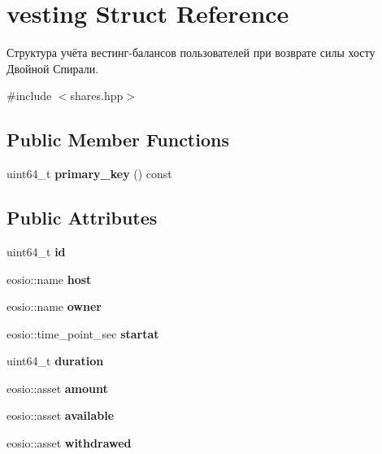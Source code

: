 \hypertarget{structvesting}{}\section{vesting Struct Reference}
\label{structvesting}


Структура учёта вестинг-\/балансов пользователей при возврате силы хосту Двойной Спирали.  




{\ttfamily \#include $<$shares.\+hpp$>$}

\subsection*{Public Member Functions}
\begin{DoxyCompactItemize}
\item 
\mbox{\label{structvesting_a35ede92a5445d2ab793b0bbbc18c5acb}} 
uint64\+\_\+t {\bfseries primary\+\_\+key} () const
\end{DoxyCompactItemize}
\subsection*{Public Attributes}
\begin{DoxyCompactItemize}
\item 
\mbox{\label{structvesting_a6288cd23eebb2f8bd05aec23647f7d6d}} 
uint64\+\_\+t {\bfseries id}
\item 
\mbox{\label{structvesting_ab795bee0918bd741aae82e5fb3f053a8}} 
eosio\+::name {\bfseries host}
\item 
\mbox{\label{structvesting_a8cac984b9edf45bea6c467398008d3dd}} 
eosio\+::name {\bfseries owner}
\item 
\mbox{\label{structvesting_a75d56f291bccd7edb0fd7097b7b6727f}} 
eosio\+::time\+\_\+point\+\_\+sec {\bfseries startat}
\item 
\mbox{\label{structvesting_af9d969971c6d91333ae2282a6e05e742}} 
uint64\+\_\+t {\bfseries duration}
\item 
\mbox{\label{structvesting_a1de75a68c605d780b132c09749d957b0}} 
eosio\+::asset {\bfseries amount}
\item 
\mbox{\label{structvesting_acd1b02df1f7b77e08e64dee70c93dea5}} 
eosio\+::asset {\bfseries available}
\item 
\mbox{\label{structvesting_ab60d72a07a57b50a714c8638527fe056}} 
eosio\+::asset {\bfseries withdrawed}
\end{DoxyCompactItemize}


